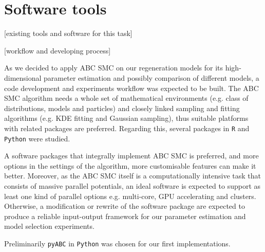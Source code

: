 \section{Software tools}

 [existing tools and software for this task]

 [workflow and developing process]

 As we decided to apply ABC SMC on our regeneration models for its high-dimensional parameter estimation and possibly comparison of different models, a code development and experiments workflow was expected to be built. The ABC SMC algorithm needs a whole set of mathematical environments (e.g. class of distributions, models and particles) and closely linked sampling and fitting algorithms (e.g. KDE fitting and Gaussian sampling), thus suitable platforms with related packages are preferred. Regarding this, several packages in \verb|R| and \verb|Python| were studied.

 A software packages that integrally implement ABC SMC is preferred, and more options in the settings of the algorithm, more customisable features can make it better. Moreover, as the ABC SMC itself is a computationally intensive task that consists of massive parallel potentials, an ideal software is expected to support as least one kind of parallel options e.g. multi-core, GPU accelerating and clusters. Otherwise, a modification or rewrite of the software package are expected to produce a reliable input-output framework for our parameter estimation and model selection experiments.

 Preliminarily \verb|pyABC| \cite{ref:pyabc} in \verb|Python| was chosen for our first implementations. 